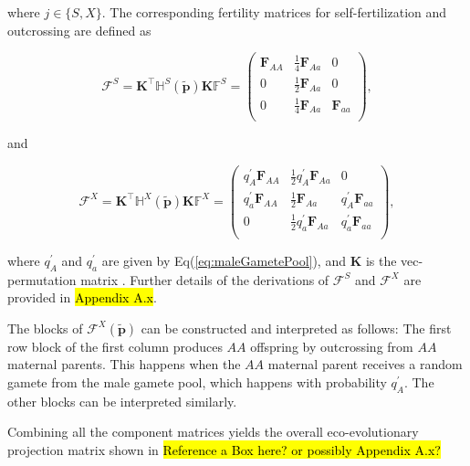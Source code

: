 \documentclass[11pt]{article}
\def\mbf#1{\mathbf{#1}}
\def\mbb#1{\mathbb{#1}}
\def\mcal#1{\mathcal{#1}}
\begin{document}
\noindent where $j \in \{S,X\}$. The corresponding fertility matrices for self-fertilization and outcrossing are defined as
\begin{linenomath*}
\begin{equation} \label{eq:FS}
	\mcal{F}^S = \mbf{K}^{\intercal} \mbb{H}^S(\tilde{\mbf{p}}) \mbf{K} \mbb{F}^S = 
			\left(
			\begin{array}{ccc}
				\mbf{F}_{AA} & \frac{1}{4} \mbf{F}_{Aa} & 0 \\
				0 & \frac{1}{2} \mbf{F}_{Aa} & 0 \\
				0 & \frac{1}{4} \mbf{F}_{Aa} & \mbf{F}_{aa}\\
			\end{array} \right), 
\end{equation}
\end{linenomath*}
\noindent and 
\begin{linenomath*}
\begin{equation} \label{eq:FX}
	\mcal{F}^X = \mbf{K}^{\intercal} \mbb{H}^X(\tilde{\mbf{p}}) \mbf{K} \mbb{F}^X = 
			\left(
			\begin{array}{ccc}
				q^{\prime}_{A} \mbf{F}_{AA} & \frac{1}{2} q^{\prime}_{A} \mbf{F}_{Aa} & 0 \\ 
				q^{\prime}_{a} \mbf{F}_{AA} & \frac{1}{2} \mbf{F}_{Aa} & q^{\prime}_{A} \mbf{F}_{aa}  \\ 
				0 & \frac{1}{2} q^{\prime}_{a} \mbf{F}_{Aa} & q^{\prime}_{a} \mbf{F}_{aa}  \\
			\end{array} \right),
\end{equation}
\end{linenomath*}

\noindent where $q^{\prime}_A$ and $q^{\prime}_a$ are given by Eq(\ref{eq:maleGametePool}), and $\mbf{K}$ is the vec-permutation matrix \citep{HendersonSearle1981}. Further details of the derivations of $\mcal{F}^S$ and $\mcal{F}^X$ are provided in \hl{Appendix A.x}. 

The blocks of $\mcal{F}^X(\tilde{\mbf{p}})$ can be constructed and interpreted as follows: The first row block of the first column produces $AA$ offspring by outcrossing from $AA$ maternal parents. This happens when the $AA$ maternal parent receives a random gamete from the male gamete pool, which happens with probability $q^{\prime}_{A}$. The other blocks can be interpreted similarly.

Combining all the component matrices yields the overall eco-evolutionary projection matrix shown in \hl{Reference a Box here?  or possibly Appendix A.x?}
\end{document}
